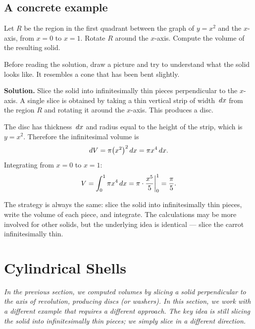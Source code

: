 \subsection*{A concrete example}

\begin{example}
\label{ex:10-1}
Let $R$ be the region in the first quadrant between the graph of $y = x^{2}$ and the $x$-axis, from $x = 0$ to $x = 1$.  Rotate $R$ around the $x$-axis.  Compute the volume of the resulting solid.
\end{example}

\begin{remark}
Before reading the solution, draw a picture and try to understand what the solid looks like.  It resembles a cone that has been bent slightly.
\end{remark}

\textbf{Solution.}  Slice the solid into infinitesimally thin pieces perpendicular to the $x$-axis.  A single slice is obtained by taking a thin vertical strip of width $\,dx$ from the region $R$ and rotating it around the $x$-axis.  This produces a disc.

The disc has thickness $\,dx$ and radius equal to the height of the strip, which is $y = x^{2}$.  Therefore the infinitesimal volume is
\[
  dV = \pi\bigl(x^{2}\bigr)^{2}\,dx = \pi x^{4}\,dx.
\]
Integrating from $x = 0$ to $x = 1$:
\[
  V = \int_{0}^{1} \pi x^{4}\,dx = \pi\cdot\frac{x^{5}}{5}\bigg|_{0}^{1} = \frac{\pi}{5}.
\]

\begin{remark}
The strategy is always the same: slice the solid into infinitesimally thin pieces, write the volume of each piece, and integrate.  The calculations may be more involved for other solids, but the underlying idea is identical --- slice the carrot infinitesimally thin.
\end{remark}

\section{Cylindrical Shells}
\label{sec:10.2}

\textit{In the previous section, we computed volumes by slicing a solid perpendicular to the axis of revolution, producing discs (or washers).  In this section, we work with a different example that requires a different approach.  The key idea is still slicing the solid into infinitesimally thin pieces; we simply slice in a different direction.}

